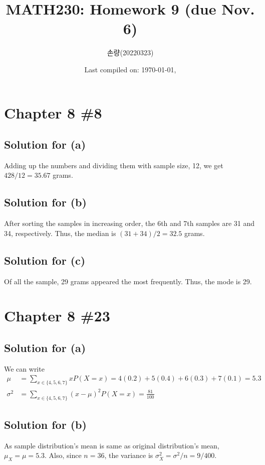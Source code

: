 \documentclass{scrartcl}
\title{MATH230: Homework 9 (due Nov. 6)}
\author{손량(20220323)}
\date{Last compiled on: \today, \currenttime}
\begin{document}
\maketitle

\section{Chapter 8 \#8}
\subsection{Solution for (a)}
Adding up the numbers and dividing them with sample size, 12, we get \(428 / 12
= 35.67\) grams.

\subsection{Solution for (b)}
After sorting the samples in increasing order, the 6th and 7th samples are 31
and 34, respectively. Thus, the median is \((31 + 34) / 2 = 32.5\) grams.

\subsection{Solution for (c)}
Of all the sample, 29 grams appeared the most frequently. Thus, the mode is 29.

\section{Chapter 8 \#23}
\subsection{Solution for (a)}
We can write
\begin{align*}
  \mu
  &= \sum_{x \in \{4, 5, 6, 7\}} x P(X = x)
  = 4 (0.2) + 5 (0.4) + 6 (0.3) + 7 (0.1)
  = 5.3 \\
  \sigma^2
  &= \sum_{x \in \{4, 5, 6, 7\}} (x - \mu)^2 P(X = x)
  = \frac{81}{100}
\end{align*}

\subsection{Solution for (b)}
As sample distribution's mean is same as original distribution's mean, \(\mu_X
= \mu = 5.3\). Also, since \(n = 36\), the variance is \(\sigma^2_X = \sigma^2
/ n = 9 / 400\).
\end{document}
